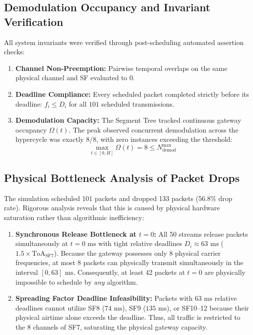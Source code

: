 \documentclass{article}
\begin{document}
\subsection{Demodulation Occupancy and Invariant Verification}
All system invariants were verified through post-scheduling automated assertion checks:
\begin{enumerate}
    \item \textbf{Channel Non-Preemption:} Pairwise temporal overlaps on the same physical channel and SF evaluated to 0.
    \item \textbf{Deadline Compliance:} Every scheduled packet completed strictly before its deadline: $f_i \le D_i$ for all $101$ scheduled transmissions.
    \item \textbf{Demodulation Capacity:} The Segment Tree tracked continuous gateway occupancy $\Omega(t)$. The peak observed concurrent demodulation across the hypercycle was exactly $8/8$, with zero instances exceeding the threshold:
    \begin{equation}
    \max_{t \in [0, H]} \Omega(t) = 8 \le N_{\text{demod}}^{\max}
    \end{equation}
\end{enumerate}

\subsection{Physical Bottleneck Analysis of Packet Drops}
The simulation scheduled 101 packets and dropped 133 packets (56.8\% drop rate). Rigorous analysis reveals that this is caused by physical hardware saturation rather than algorithmic inefficiency:
\begin{enumerate}
    \item \textbf{Synchronous Release Bottleneck at $t=0$:} All 50 streams release packets simultaneously at $t = 0\text{ ms}$ with tight relative deadlines $D_i \approx 63\text{ ms}$ ($1.5 \times \text{ToA}_{\text{SF7}}$). Because the gateway possesses only 8 physical carrier frequencies, at most 8 packets can physically transmit simultaneously in the interval $[0, 63]\text{ ms}$. Consequently, at least 42 packets at $t=0$ are physically impossible to schedule by \emph{any} algorithm.
    \item \textbf{Spreading Factor Deadline Infeasibility:} Packets with $63\text{ ms}$ relative deadlines cannot utilize SF8 ($74\text{ ms}$), SF9 ($135\text{ ms}$), or SF10--12 because their physical airtime alone exceeds the deadline. Thus, all traffic is restricted to the 8 channels of SF7, saturating the physical gateway capacity.
\end{enumerate}
\end{document}
